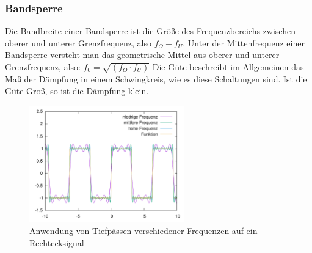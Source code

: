 \subsubsection{Bandsperre}
Die Bandbreite einer Bandsperre ist die Größe des Frequenzbereichs zwischen oberer und unterer Grenzfrequenz, also $f_O -f_U$.
Unter der Mittenfrequenz einer Bandsperre versteht man das geometrische Mittel aus oberer und unterer Grenzfrequenz, also: $f_0=\sqrt{(f_O \cdot f_U)}$
Die Güte beschreibt im Allgemeinen das Maß der Dämpfung in einem Schwingkreis, wie es diese Schaltungen sind.
Ist die Güte Groß, so ist die Dämpfung klein.
\begin{figure}[H]
    \centering
	\includegraphics[width=0.6\textwidth]{Abb/rechteck_tiefpass.pdf} 
    \caption{Anwendung von Tiefpässen verschiedener Frequenzen auf ein Rechtecksignal}
\end{figure}

